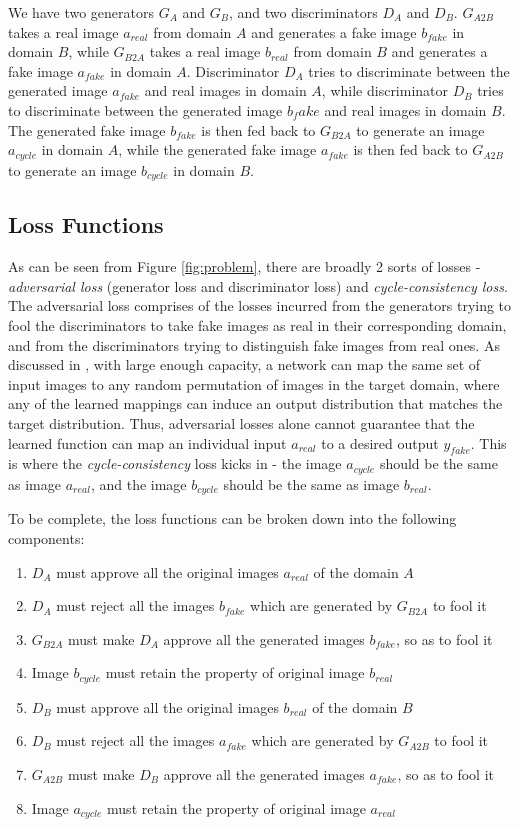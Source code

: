 \documentclass[10pt,twocolumn,letterpaper]{article}
\begin{document}
We have two generators $G_A$ and $G_B$, and two discriminators $D_A$ and $D_B$. $G_{A2B}$ takes a real 
image $a_{real}$ from domain $A$ and generates a fake image $b_{fake}$ in domain $B$, while $G_{B2A}$ 
takes a real image $b_{real}$ from domain $B$ and generates a fake image $a_{fake}$ in domain $A$. 
Discriminator $D_A$ tries to discriminate between the generated image $a_{fake}$ and real images in 
domain $A$, while discriminator $D_B$ tries to discriminate between the generated image $b_fake$ and 
real images in domain $B$. The generated fake image $b_{fake}$ is then fed back to $G_{B2A}$ to 
generate an image $a_{cycle}$ in domain $A$, while the generated fake image $a_{fake}$ is then fed back 
to $G_{A2B}$ to generate an image $b_{cycle}$ in domain $B$. 

\subsection{Loss Functions}
As can be seen from Figure \ref{fig:problem}, there are broadly 2 sorts of losses - \textit{adversarial 
loss} (generator loss and discriminator loss) and \textit{cycle-consistency loss}. The adversarial loss 
comprises of the losses incurred from the generators trying to fool the discriminators to take fake 
images as real in their corresponding domain, and from the discriminators trying to distinguish fake 
images from real ones. As discussed in \cite{cyclegan}, with large enough capacity, a network can map 
the same set of input images to any random permutation of images in
the target domain, where any of the learned mappings can
induce an output distribution that matches the target distribution.
Thus, adversarial losses alone cannot guarantee
that the learned function can map an individual input $a_{real}$
to a desired output $y_{fake}$. This is where the \textit{cycle-consistency} loss kicks in - the image 
$a_{cycle}$ should be the same as image $a_{real}$, and the image $b_{cycle}$ should be the same as 
image $b_{real}$.

To be complete, the loss functions can be broken down into the following components:

\begin{enumerate}
\item $D_A$ must approve all the original images $a_{real}$ of the domain $A$
\item $D_A$ must reject all the images $b_{fake}$ which are generated by $G_{B2A}$ to fool it
\item $G_{B2A}$ must make $D_A$ approve all the generated images $b_{fake}$, so as to fool it
\item Image $b_{cycle}$ must retain the property of original image $b_{real}$
\item $D_B$ must approve all the original images $b_{real}$ of the domain $B$
\item $D_B$ must reject all the images $a_{fake}$ which are generated by $G_{A2B}$ to fool it
\item $G_{A2B}$ must make $D_B$ approve all the generated images $a_{fake}$, so as to fool it
\item Image $a_{cycle}$ must retain the property of original image $a_{real}$
\end{enumerate}
\end{document}
